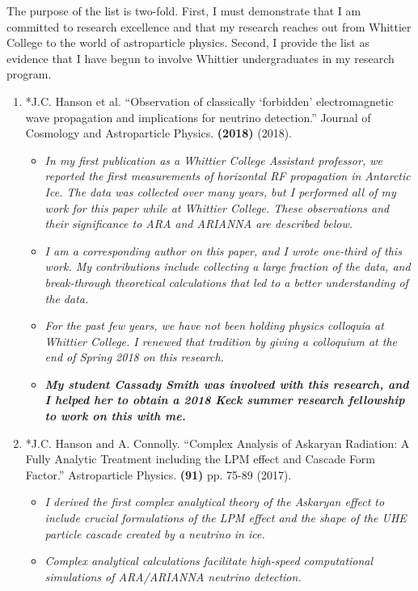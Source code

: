 \documentclass[../../main.tex]{subfiles}
\begin{document}
The purpose of the list is two-fold.  First, I must demonstrate that I am committed to research excellence and that my research reaches out from Whittier College to the world of astroparticle physics.  Second, I provide the list as evidence that I have begun to involve Whittier undergraduates in my research program. \\ \hspace{0.1cm}

\begin{enumerate}
\item *J.C. Hanson et al. ``Observation of classically ‘forbidden’ electromagnetic wave propagation and implications for neutrino detection.'' Journal of Cosmology and Astroparticle Physics. \textbf{(2018)} (2018).
\begin{itemize}
\item \textit{In my first publication as a Whittier College Assistant professor, we reported the first measurements of horizontal RF propagation in Antarctic Ice.  The data was collected over many years, but I performed all of my work for this paper while at Whittier College.  These observations and their significance to ARA and ARIANNA are described below.}
\item \textit{I am a corresponding author on this paper, and I wrote one-third of this work.  My contributions include collecting a large fraction of the data, and break-through theoretical calculations that led to a better understanding of the data.}
\item \textit{For the past few years, we have not been holding physics colloquia at Whittier College.  I renewed that tradition by giving a colloquium at the end of Spring 2018 on this research.}
\item \textit{\textbf{My student Cassady Smith was involved with this research, and I helped her to obtain a 2018 Keck summer research fellowship to work on this with me.}}
\end{itemize}
\item *J.C. Hanson and A. Connolly. ``Complex Analysis of Askaryan Radiation: A Fully Analytic Treatment including the LPM effect and Cascade Form Factor.'' Astroparticle Physics. \textbf{(91)} pp. 75-89 (2017).
\begin{itemize}
\item \textit{I derived the first complex analytical theory of the Askaryan effect to include crucial formulations of the LPM effect and the shape of the UHE particle cascade created by a neutrino in ice.}
\item \textit{Complex analytical calculations facilitate high-speed computational simulations of ARA/ARIANNA neutrino detection.}

\end{itemize}
\end{enumerate}
\end{document}
